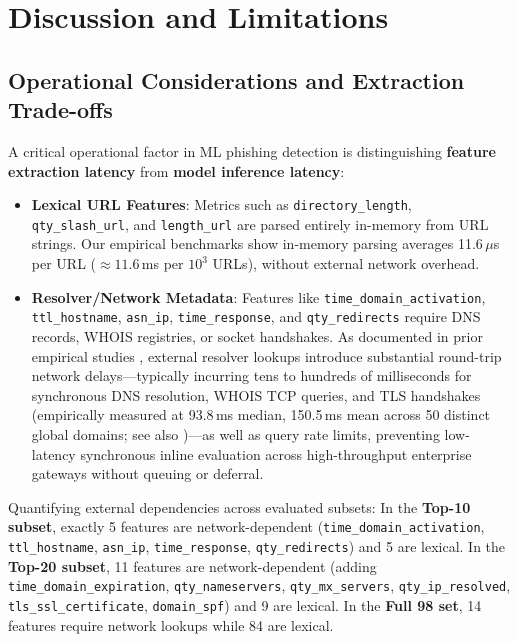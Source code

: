\section{Discussion and Limitations}
\label{sec:discussion}

\subsection{Operational Considerations and Extraction Trade-offs}
A critical operational factor in ML phishing detection is distinguishing \textbf{feature extraction latency} from \textbf{model inference latency}:
\begin{itemize}
    \item \textbf{Lexical URL Features}: Metrics such as \texttt{directory\_length}, \texttt{qty\_slash\_url}, and \texttt{length\_url} are parsed entirely in-memory from URL strings. Our empirical benchmarks show in-memory parsing averages 11.6\,$\mu$s per URL ($\approx 11.6$\,ms per $10^3$ URLs), without external network overhead.
    \item \textbf{Resolver/Network Metadata}: Features like \texttt{time\_domain\_activation}, \texttt{ttl\_hostname}, \texttt{asn\_ip}, \texttt{time\_response}, and \texttt{qty\_redirects} require DNS records, WHOIS registries, or socket handshakes. As documented in prior empirical studies \cite{hannousse2021towards, marchal2017off}, external resolver lookups introduce substantial round-trip network delays—typically incurring tens to hundreds of milliseconds for synchronous DNS resolution, WHOIS TCP queries, and TLS handshakes (empirically measured at 93.8\,ms median, 150.5\,ms mean across 50 distinct global domains; see also \cite{hannousse2021towards, marchal2017off})—as well as query rate limits, preventing low-latency synchronous inline evaluation across high-throughput enterprise gateways without queuing or deferral.
\end{itemize}

Quantifying external dependencies across evaluated subsets:
In the \textbf{Top-10 subset}, exactly 5 features are network-dependent (\texttt{time\_domain\_activation}, \texttt{ttl\_hostname}, \texttt{asn\_ip}, \texttt{time\_response}, \texttt{qty\_redirects}) and 5 are lexical. In the \textbf{Top-20 subset}, 11 features are network-dependent (adding \texttt{time\_domain\_expiration}, \texttt{qty\_nameservers}, \texttt{qty\_mx\_servers}, \texttt{qty\_ip\_resolved}, \texttt{tls\_ssl\_certificate}, \texttt{domain\_spf}) and 9 are lexical. In the \textbf{Full 98 set}, 14 features require network lookups while 84 are lexical.

